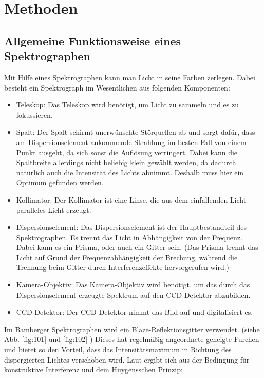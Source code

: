 \section{Methoden}

\subsection{Allgemeine Funktionsweise eines Spektrographen}
Mit Hilfe eines Spektrographen kann man Licht in seine Farben zerlegen. Dabei besteht ein Spektrograph im Wesentlichen aus folgenden Komponenten:

\begin{itemize}

\item Teleskop: Das Teleskop wird benötigt, um Licht zu sammeln und es zu fokussieren.

\item Spalt: Der Spalt schirmt unerwünschte Störquellen ab und sorgt dafür, dass am Dispersionselement ankommende Strahlung im besten Fall von einem Punkt ausgeht, da sich sonst die Auflösung verringert. Dabei kann die Spaltbreite allerdings nicht beliebig klein gewählt  werden, da dadurch natürlich auch die Intensität des Lichts abnimmt. Deshalb muss hier ein Optimum gefunden werden.

\item Kollimator: Der Kollimator ist eine Linse, die aus dem einfallenden Licht paralleles Licht erzeugt.

\item Dispersionselement: Das Dispersionselement ist der Hauptbestandteil des Spektrographen. Es trennt das Licht in Abhängigkeit von der Frequenz. Dabei kann es ein Prisma, oder auch ein Gitter sein. (Das Prisma trennt das Licht auf Grund der Frequenzabhängigkeit der Brechung, während die Trennung beim Gitter durch Interferenzeffekte hervorgerufen wird.)

\item Kamera-Objektiv: Das Kamera-Objektiv wird benötigt, um das durch das Dispersionselement erzeugte Spektrum auf den CCD-Detektor abzubilden.

\item CCD-Detektor: Der CCD-Detektor nimmt das Bild auf und digitalisiert es.

\end{itemize}
Im Bamberger Spektrographen wird ein Blaze-Reflektionsgitter verwendet. (siehe Abb. \ref{fig:101} und \ref{fig:102} ) Dieses hat regelmäßig angeordnete geneigte Furchen und bietet so den Vorteil, dass das Intensitätsmaximum in Richtung des dispergierten Lichtes verschoben wird. Laut \cite{ronomischesPraktikum} ergibt sich aus der Bedingung für konstruktive Interferenz und dem Huygensschen Prinzip:

